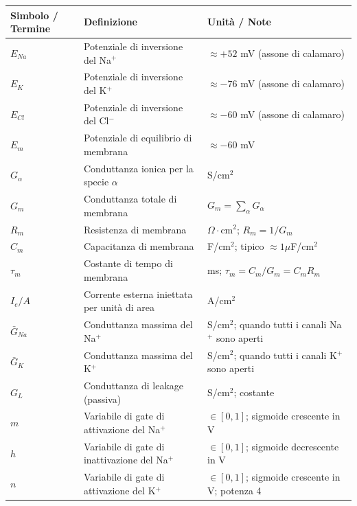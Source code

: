 \begin{table}[htbp]
    \centering
    \footnotesize
    \renewcommand{\arraystretch}{1.3}
    \begin{tabularx}{\textwidth}{|>{\raggedright\arraybackslash}p{3cm}|>{\raggedright\arraybackslash}X|>{\raggedright\arraybackslash}X|}
    \hline
    \textbf{Simbolo / Termine} & \textbf{Definizione} & \textbf{Unità / Note} \\
    \hline
    $E_{Na}$ & Potenziale di inversione del Na$^+$ & $\approx +52$ mV (assone di calamaro) \\
    \hline
    $E_K$ & Potenziale di inversione del K$^+$ & $\approx -76$ mV (assone di calamaro) \\
    \hline
    $E_{Cl}$ & Potenziale di inversione del Cl$^-$ & $\approx -60$ mV (assone di calamaro) \\
    \hline
    $E_m$ & Potenziale di equilibrio di membrana & $\approx -60$ mV \\
    \hline
    $G_\alpha$ & Conduttanza ionica per la specie $\alpha$ & S/cm$^2$ \\
    \hline
    $G_m$ & Conduttanza totale di membrana & $G_m = \sum_\alpha G_\alpha$ \\
    \hline
    $R_m$ & Resistenza di membrana & $\Omega \cdot$cm$^2$; $R_m = 1/G_m$ \\
    \hline
    $C_m$ & Capacitanza di membrana & F/cm$^2$; tipico $\approx 1 \mu$F/cm$^2$ \\
    \hline
    $\tau_m$ & Costante di tempo di membrana & ms; $\tau_m = C_m/G_m = C_m R_m$ \\
    \hline
    $I_e/A$ & Corrente esterna iniettata per unità di area & A/cm$^2$ \\
    \hline
    $\bar{G}_{Na}$ & Conduttanza massima del Na$^+$ & S/cm$^2$; quando tutti i canali Na$^+$ sono aperti \\
    \hline
    $\bar{G}_K$ & Conduttanza massima del K$^+$ & S/cm$^2$; quando tutti i canali K$^+$ sono aperti \\
    \hline
    $G_L$ & Conduttanza di leakage (passiva) & S/cm$^2$; costante \\
    \hline
    $m$ & Variabile di gate di attivazione del Na$^+$ & $\in [0,1]$; sigmoide crescente in V \\
    \hline
    $h$ & Variabile di gate di inattivazione del Na$^+$ & $\in [0,1]$; sigmoide decrescente in V \\
    \hline
    $n$ & Variabile di gate di attivazione del K$^+$ & $\in [0,1]$; sigmoide crescente in V; potenza 4 \\

\end{tabularx}
\end{table}
